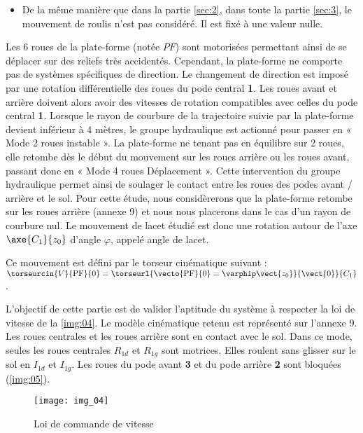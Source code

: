 \begin{itemize}
\item De la même manière que dans la partie \ref{sec:2}, dans toute la partie \ref{sec:3}, le mouvement de roulis n’est pas considéré.
Il est fixé à une valeur nulle.
\end{itemize}
Les 6 roues de la plate-forme (notée $PF$) sont motorisées permettant ainsi de se déplacer sur des reliefs très
accidentés. Cependant, la plate-forme ne comporte pas de systèmes spécifiques de direction. Le changement de
direction est imposé par une rotation différentielle des roues du pode central \textbf{1}. Les roues avant et arrière doivent alors
avoir des vitesses de rotation compatibles avec celles du pode central \textbf{1}. Lorsque le rayon de courbure de la trajectoire
suivie par la plate-forme devient inférieur à 4 mètres, le groupe hydraulique est actionné pour passer en « Mode 2
roues instable ». La plate-forme ne tenant pas en équilibre sur 2 roues, elle retombe dès le début du mouvement sur
les roues arrière ou les roues avant, passant donc en « Mode 4 roues Déplacement ». Cette intervention du groupe
hydraulique permet ainsi de soulager le contact entre les roues des podes avant / arrière et le sol. Pour cette étude,
nous considèrerons que la plate-forme retombe sur les roues arrière (annexe 9) et nous nous placerons dans le cas
d’un rayon de courbure nul. Le mouvement de lacet étudié est donc une rotation autour de l’axe $\axe{C_1}{z_0}$ d’angle $\varphi$,
appelé angle de lacet.

Ce mouvement est défini par le torseur cinématique suivant : 
$\torseurcin{V}{\text{PF}}{0} = \torseurl{\vecto{\text{PF}}{0}=\varphip \vect{z_0}}{\vect{0}}{C_1}$.

L’objectif de cette partie est de valider l’aptitude du système à respecter la
loi de vitesse de la \autoref{img:04}.
Le modèle cinématique retenu est représenté sur l’annexe 9.
Les roues centrales et les roues arrière sont en contact avec le sol. Dans ce
mode, seules les roues centrales $R_{1d}$ et $R_{1g}$ sont motrices. Elles roulent
sans glisser sur le sol en $I_{1d}$ et $I_{1g}$. Les roues du pode avant \textbf{3} et du pode
arrière \textbf{2} sont bloquées (\autoref{img:05}).

\begin{figure}[!h]
\centering
\texttt{[image: img\_04]}
\caption{Loi de commande de vitesse \label{img:04}}
\end{figure}

